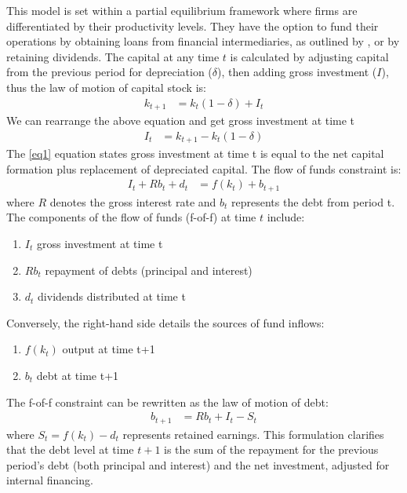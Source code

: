 \documentclass[12pt]{report}
\begin{document}
This model is set within a partial equilibrium framework where firms are differentiated by their productivity levels.
They have the option to fund their operations by obtaining loans from financial intermediaries, as outlined by
\cite{bernanke1995inside}, or by retaining dividends. The capital at any time \(t\) is calculated by
adjusting capital from the previous period for depreciation (\(\delta\)), then adding gross investment (\(I\)), thus the
law of motion of capital stock is: 
\begin{align*}
    k_{t+1} &= k_{t}(1 - \delta)  + I_t  
\end{align*} 
We can rearrange  the above equation and get gross investment at time t
\begin{align}
    I_t &= k_{t+1} - k_{t}\left(1-\delta\right) \label{eq1}
\end{align} 
The \ref{eq1} equation states gross investment at time t is equal to the net capital formation plus replacement
of depreciated capital. 
The flow of funds constraint is:
\begin{align}
    I_t + R b_{t} + d_t &= f(k_t) + b_{t+1} \label{eq2}
\end{align}
where \(R\) denotes the gross interest rate and \(b_{t}\) represents the debt from period t.
The components of the flow of funds (f-of-f) at time \(t\) include:
\begin{enumerate}
    \item \(I_t\) gross investment at time t
    \item \(R b_{t}\) repayment of debts (principal and interest) 
    \item \(d_t\) dividends distributed at time t
\end{enumerate}

Conversely, the right-hand side details the sources of fund inflows:
\begin{enumerate}
    \item \(f(k_{t}) \) output at time t+1
    \item  \(b_t\) debt at time t+1
\end{enumerate}

The f-of-f constraint can be rewritten as the law of motion of debt: 
\begin{align} 
    b_{t+1} &= R b_{t} + I_{t} - S_{t}  \label{eq2'}
\end{align} 
where \(S_{t} = f(k_{t}) - d_t\) represents  retained earnings.
This formulation clarifies that the debt level at time \(t+1\) is the sum of the repayment for the previous period's debt
(both principal and interest) and the net investment, adjusted for internal financing.
\end{document}
